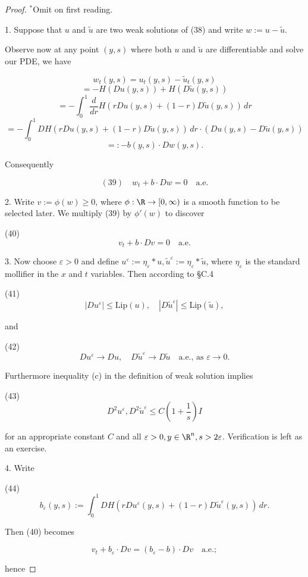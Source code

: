 \begin{proof}
$^*$Omit on first reading.

1. Suppose that $u$ and $\tilde{u}$ are two weak solutions of (38) and write $w := u - \tilde{u}$.

Observe now at any point $(y,s)$ where both $u$ and $\tilde{u}$ are differentiable and solve our PDE, we have

$$w_t(y,s) = u_t(y,s) - \tilde{u}_t(y,s)$$
$$= -H(Du(y,s)) + H(D\tilde{u}(y,s))$$
$$= -\int_0^1 \frac{d}{dr} H(rDu(y,s) + (1-r)D\tilde{u}(y,s)) \, dr$$
$$= -\int_0^1 DH(rDu(y,s) + (1-r)D\tilde{u}(y,s)) \, dr \cdot (Du(y,s) - D\tilde{u}(y,s))$$
$$=: -b(y,s) \cdot Dw(y,s).$$

Consequently

$$(39) \quad w_t + b \cdot Dw = 0 \quad \text{a.e.}$$

2. Write $v := \phi(w) \geq 0$, where $\phi : \R \to [0, \infty)$ is a smooth function to be selected later. We multiply (39) by $\phi'(w)$ to discover

(40)
$$v_t + b \cdot Dv = 0 \quad \text{a.e.}$$

3. Now choose $\varepsilon > 0$ and define $u^\varepsilon := \eta_\varepsilon * u, \tilde{u}^\varepsilon := \eta_\varepsilon * \tilde{u}$, where $\eta_\varepsilon$ is the standard mollifier in the $x$ and $t$ variables. Then according to \S C.4

(41)
$$|Du^\varepsilon| \leq \text{Lip}(u), \quad |D\tilde{u}^\varepsilon| \leq \text{Lip}(\tilde{u}),$$

and

(42)
$$Du^\varepsilon \to Du, \quad D\tilde{u}^\varepsilon \to D\tilde{u} \quad \text{a.e., as } \varepsilon \to 0.$$

Furthermore inequality (c) in the definition of weak solution implies

(43)
$$D^2 u^\varepsilon, D^2 \tilde{u}^\varepsilon \leq C \left(1 + \frac{1}{s}\right) I$$

for an appropriate constant $C$ and all $\varepsilon > 0, y \in \R^n, s > 2\varepsilon$. Verification is left as an exercise.

4. Write

(44)
$$b_\varepsilon(y,s) := \int_0^1 DH(rDu^\varepsilon(y,s) + (1-r)D\tilde{u}^\varepsilon(y,s)) \, dr.$$

Then (40) becomes

$$v_t + b_\varepsilon \cdot Dv = (b_\varepsilon - b) \cdot Dv \quad \text{a.e.};$$

hence


\end{proof}
